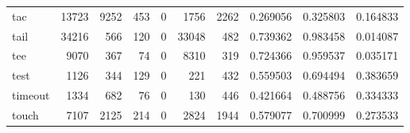 \begin{tabular}{lrrrrrrrrr}
tac       &                               13723 &                                            9252 &                                            453 &                                             0 &                                           1756 &                                         2262 &                                           0.269056 &                               0.325803 &                             0.164833 \\
tail      &                               34216 &                                             566 &                                            120 &                                             0 &                                          33048 &                                          482 &                                           0.739362 &                               0.983458 &                             0.014087 \\
tee       &                                9070 &                                             367 &                                             74 &                                             0 &                                           8310 &                                          319 &                                           0.724366 &                               0.959537 &                             0.035171 \\
test      &                                1126 &                                             344 &                                            129 &                                             0 &                                            221 &                                          432 &                                           0.559503 &                               0.694494 &                             0.383659 \\
timeout   &                                1334 &                                             682 &                                             76 &                                             0 &                                            130 &                                          446 &                                           0.421664 &                               0.488756 &                             0.334333 \\
touch     &                                7107 &                                            2125 &                                            214 &                                             0 &                                           2824 &                                         1944 &                                           0.579077 &                               0.700999 &                             0.273533 \\

\end{tabular}
